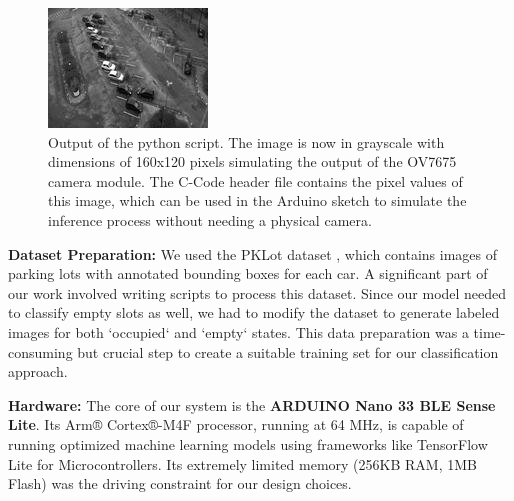 \documentclass[sigconf,10pt,nonacm]{acmart}
\begin{document}
\begin{figure}[h!]
    \centering
    \includegraphics[width=\linewidth]{./images/output.jpg}
    \caption{Output of the python script. The image is now in grayscale with dimensions of 160x120 pixels simulating the output of the OV7675 camera module. The C-Code header file contains the pixel values of this image, which can be used in the Arduino sketch to simulate the inference process without needing a physical camera.}
    \label{fig:output}
\end{figure}

\noindent\textbf{Dataset Preparation:} We used the PKLot dataset \cite{pklot}, which contains images of parking lots with annotated bounding boxes for each car. A significant part of our work involved writing scripts to process this dataset. Since our model needed to classify empty slots as well, we had to modify the dataset to generate labeled images for both `occupied` and `empty` states. This data preparation was a time-consuming but crucial step to create a suitable training set for our classification approach.

\noindent\textbf{Hardware:} The core of our system is the \textbf{ARDUINO Nano 33 BLE Sense Lite}. Its Arm® Cortex®-M4F processor, running at 64 MHz, is capable of running optimized machine learning models using frameworks like TensorFlow Lite for Microcontrollers. Its extremely limited memory (256KB RAM, 1MB Flash) was the driving constraint for our design choices.
\end{document}
